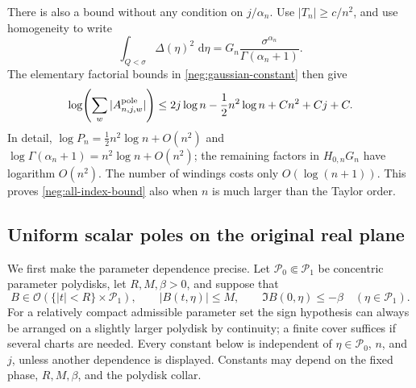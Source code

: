 \documentclass[11pt]{article}
\numberwithin{equation}{section}
\theoremstyle{definition}
\newcommand{\dd}{\,\mathrm d}
\begin{document}
There is also a bound without any condition on \(j/\alpha_n\).
Use \(|T_n|\ge c/n^2\), and use homogeneity to write
\[
 \int_{Q<\sigma}\Delta(\eta)^2\,\dd\eta
       =G_n\frac{\sigma^{\alpha_n}}{\Gamma(\alpha_n+1)}.
 \]
The elementary factorial bounds in \eqref{neg:gaussian-constant}
then give
\begin{equation}
 \log\!\left(\sum_w|A^{\rm pole}_{n,j,w}|\right)
 \le 2j\log n-\frac12n^2\log n+Cn^2+Cj+C .
 \label{neg:all-index-bound}
\end{equation}
In detail,
\(\log P_n=\tfrac12n^2\log n+O(n^2)\) and
\(\log\Gamma(\alpha_n+1)=n^2\log n+O(n^2)\);
the remaining factors in \(H_{0,n}G_n\) have logarithm \(O(n^2)\).
The number of windings costs only \(O(\log(n+1))\).
This proves \eqref{neg:all-index-bound} also when \(n\) is much
larger than the Taylor order.


\subsection{Uniform scalar poles on the original real plane}
\label{neg:real-poles}

We first make the parameter dependence precise.  Let
\(\mathcal P_0\Subset\mathcal P_1\) be concentric parameter polydisks,
let \(R,M,\beta>0\), and suppose that
\[
 B\in\mathcal O(\{|t|<R\}\times\mathcal P_1),\qquad
 |B(t,\eta)|\le M,\qquad
 \Im B(0,\eta)\le-\beta\quad(\eta\in\mathcal P_1).
\]
For a relatively compact admissible parameter set the sign hypothesis
can always be arranged on a slightly larger polydisk by continuity;
a finite cover suffices if several charts are needed.  Every constant
below is independent of \(\eta\in\mathcal P_0\), \(n\), and \(j\),
unless another dependence is displayed.  Constants may depend on the
fixed phase, \(R,M,\beta\), and the polydisk collar.
\end{document}
